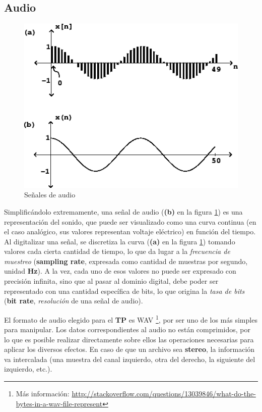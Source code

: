 \subsection{Audio}
\label{subsec:audio}

\begin{figure}[H]
    \centering
    \includegraphics[scale=0.6]{imagenes/signals.png}
    \caption{Señales de audio}
    \label{fig:signals}
\end{figure}

Simplificándolo extremamente, una señal de audio (\textbf{(b)} en la figura \ref{fig:signals}) es una representación del sonido, que puede ser visualizado como una curva continua (en el caso analógico, sus valores representan voltaje eléctrico) en función del tiempo. Al digitalizar una señal, se discretiza la curva (\textbf{(a)} en la figura \ref{fig:signals}) tomando valores cada cierta cantidad de tiempo, lo que da lugar a la \textit{frecuencia de muestreo} (\textbf{sampling rate}, expresada como cantidad de muestras por segundo, unidad \textbf{Hz}). A la vez, cada uno de esos valores no puede ser expresado con precisión infinita, sino que al pasar al dominio digital, debe poder ser representado con una cantidad específica de bits, lo que origina la \textit{tasa de bits} (\textbf{bit rate}, \textit{resolución} de una señal de audio). \vspace{\baselineskip}

El formato de audio elegido para el \textbf{TP} es WAV \footnote{Más información: \url{http://stackoverflow.com/questions/13039846/what-do-the-bytes-in-a-wav-file-represent}}, por ser uno de los más simples para manipular. Los datos correspondientes al audio no están comprimidos, por lo que es posible realizar directamente sobre ellos las operaciones necesarias para aplicar los diversos efectos. En caso de que un archivo sea \textbf{stereo}, la información va intercalada (una muestra del canal izquierdo, otra del derecho, la siguiente del izquierdo, etc.).\vspace{\baselineskip}

